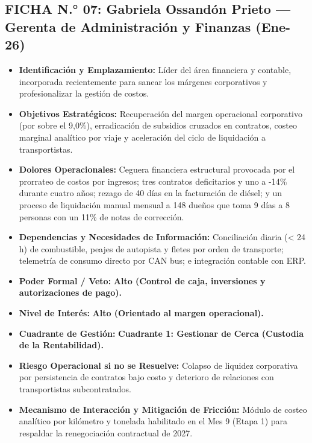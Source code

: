 \subsection*{FICHA N.° 07: Gabriela Ossandón Prieto — Gerenta de Administración y Finanzas (Ene-26)}
\begin{itemize}
\item \textbf{Identificación y Emplazamiento:} Líder del área financiera y contable, incorporada recientemente para sanear los márgenes corporativos y profesionalizar la gestión de costos.
\item \textbf{Objetivos Estratégicos:} Recuperación del margen operacional corporativo (por sobre el 9,0\%), erradicación de subsidios cruzados en contratos, costeo marginal analítico por viaje y aceleración del ciclo de liquidación a transportistas.
\item \textbf{Dolores Operacionales:} Ceguera financiera estructural provocada por el prorrateo de costos por ingresos; tres contratos deficitarios y uno a -14\% durante cuatro años; rezago de 40 días en la facturación de diésel; y un proceso de liquidación manual mensual a 148 dueños que toma 9 días a 8 personas con un 11\% de notas de corrección.
\item \textbf{Dependencias y Necesidades de Información:} Conciliación diaria (< 24 h) de combustible, peajes de autopista y fletes por orden de transporte; telemetría de consumo directo por CAN bus; e integración contable con ERP.
\item \textbf{Poder Formal / Veto:} \textbf{Alto (Control de caja, inversiones y autorizaciones de pago).}
\item \textbf{Nivel de Interés:} \textbf{Alto (Orientado al margen operacional).}
\item \textbf{Cuadrante de Gestión:} \textbf{Cuadrante 1: Gestionar de Cerca (Custodia de la Rentabilidad).}
\item \textbf{Riesgo Operacional si no se Resuelve:} Colapso de liquidez corporativa por persistencia de contratos bajo costo y deterioro de relaciones con transportistas subcontratados.
\item \textbf{Mecanismo de Interacción y Mitigación de Fricción:} Módulo de costeo analítico por kilómetro y tonelada habilitado en el Mes 9 (Etapa 1) para respaldar la renegociación contractual de 2027.
\end{itemize}
